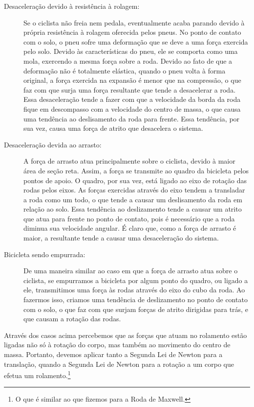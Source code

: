 \begin{description}
    \item[Desaceleração devido à resistência à rolagem:] Se o ciclista não freia nem pedala, eventualmente acaba parando devido à própria resistência à rolagem oferecida pelos pneus. No ponto de contato com o solo, o pneu sofre uma deformação que se deve a uma força exercida pelo solo. Devido às características do pneu, ele se comporta como uma mola, exercendo a mesma força sobre a roda. Devido ao fato de que a deformação não é totalmente elástica, quando o pneu volta à forma original, a força exercida na expansão é menor que na compressão, o que faz com que surja uma força resultante que tende a desacelerar a roda. Essa desaceleração tende a fazer com que a velocidade da borda da roda fique em descompasso com a velocidade do centro de massa, o que causa uma tendência ao deslisamento da roda para frente. Essa tendência, por sua vez, causa uma força de atrito que desacelera o sistema.
    \item[Desaceleração devida ao arrasto:] A força de arrasto atua principalmente sobre o ciclista, devido à maior área de seção reta. Assim, a força se transmite ao quadro da bicicleta pelos pontos de apoio. O quadro, por sua vez, está ligado ao eixo de rotação das rodas pelos eixos. As forças exercidas através do eixo tendem a transladar a roda como um todo, o que tende a causar um deslisamento da roda em relação ao solo. Essa tendência ao deslizamento tende a causar um atrito que atua para frente no ponto de contato, pois é necessário que a roda diminua sua velocidade angular. É claro que, como a força de arrasto é maior, a resultante tende a causar uma desaceleração do sistema.
    
    \item[Bicicleta sendo empurrada:] De uma maneira similar ao caso em que a força de arrasto atua sobre o ciclista, se empurramos a bicicleta por algum ponto do quadro, ou ligado a ele, transmitimos uma força às rodas através do eixo do cubo da roda. Ao fazermos isso, criamos uma tendência de deslizamento no ponto de contato com o solo, o que faz com que surjam forças de atrito dirigidas para trás, e que causam a rotação das rodas.
\end{description}

Através dos casos acima percebemos que as forças que atuam no rolamento estão ligadas não só à rotação do corpo, mas também ao movimento do centro de massa. Portanto, devemos aplicar tanto a Segunda Lei de Newton para a translação, quando a Segunda Lei de Newton para a rotação a um corpo que efetua um rolamento.\footnote{O que é similar ao que fizemos para a Roda de Maxwell.} 

